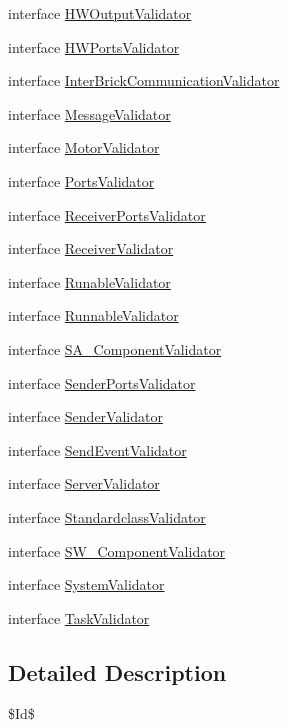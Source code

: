 \begin{DoxyCompactItemize}
interface \hyperlink{interfaceshootingmachineemfmodel_1_1validation_1_1_h_w_output_validator}{H\-W\-Output\-Validator}
\item 
interface \hyperlink{interfaceshootingmachineemfmodel_1_1validation_1_1_h_w_ports_validator}{H\-W\-Ports\-Validator}
\item 
interface \hyperlink{interfaceshootingmachineemfmodel_1_1validation_1_1_inter_brick_communication_validator}{Inter\-Brick\-Communication\-Validator}
\item 
interface \hyperlink{interfaceshootingmachineemfmodel_1_1validation_1_1_message_validator}{Message\-Validator}
\item 
interface \hyperlink{interfaceshootingmachineemfmodel_1_1validation_1_1_motor_validator}{Motor\-Validator}
\item 
interface \hyperlink{interfaceshootingmachineemfmodel_1_1validation_1_1_ports_validator}{Ports\-Validator}
\item 
interface \hyperlink{interfaceshootingmachineemfmodel_1_1validation_1_1_receiver_ports_validator}{Receiver\-Ports\-Validator}
\item 
interface \hyperlink{interfaceshootingmachineemfmodel_1_1validation_1_1_receiver_validator}{Receiver\-Validator}
\item 
interface \hyperlink{interfaceshootingmachineemfmodel_1_1validation_1_1_runable_validator}{Runable\-Validator}
\item 
interface \hyperlink{interfaceshootingmachineemfmodel_1_1validation_1_1_runnable_validator}{Runnable\-Validator}
\item 
interface \hyperlink{interfaceshootingmachineemfmodel_1_1validation_1_1_s_a___component_validator}{S\-A\-\_\-\-Component\-Validator}
\item 
interface \hyperlink{interfaceshootingmachineemfmodel_1_1validation_1_1_sender_ports_validator}{Sender\-Ports\-Validator}
\item 
interface \hyperlink{interfaceshootingmachineemfmodel_1_1validation_1_1_sender_validator}{Sender\-Validator}
\item 
interface \hyperlink{interfaceshootingmachineemfmodel_1_1validation_1_1_send_event_validator}{Send\-Event\-Validator}
\item 
interface \hyperlink{interfaceshootingmachineemfmodel_1_1validation_1_1_server_validator}{Server\-Validator}
\item 
interface \hyperlink{interfaceshootingmachineemfmodel_1_1validation_1_1_standardclass_validator}{Standardclass\-Validator}
\item 
interface \hyperlink{interfaceshootingmachineemfmodel_1_1validation_1_1_s_w___component_validator}{S\-W\-\_\-\-Component\-Validator}
\item 
interface \hyperlink{interfaceshootingmachineemfmodel_1_1validation_1_1_system_validator}{System\-Validator}
\item 
interface \hyperlink{interfaceshootingmachineemfmodel_1_1validation_1_1_task_validator}{Task\-Validator}
\end{DoxyCompactItemize}


\subsection{Detailed Description}
\$\-Id\$ 